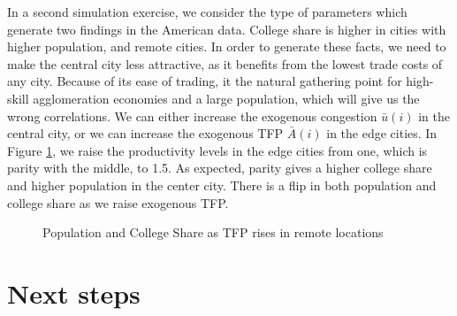 \documentclass{article}
\begin{document}
    In a second simulation exercise, we consider the type of parameters which generate two findings in the American data.  College share is higher in cities with higher population, and remote cities.  In order to generate these facts, we need to make the central city less attractive, as it benefits from the lowest trade costs of any city.  Because of its ease of trading, it the natural gathering point for high-skill agglomeration economies and a large population, which will give us the wrong correlations.  We can either increase the exogenous congestion $\bar{u}(i)$ in the central city, or we can increase the exogenous TFP $\bar{A}(i)$ in the edge cities.  In Figure \ref{fig:sim_col_share}, we raise the productivity levels in the edge cities from one, which is parity with the middle, to 1.5.  As expected, parity gives a higher college share and higher population in the center city. There is a flip in both population and college share as we raise exogenous TFP.

    \begin{figure}[!ht]
      \centering
      \caption{Population and College Share as TFP rises in remote locations}
      \label{fig:sim_col_share}
    \end{figure}

\section{Next steps}
\end{document}
